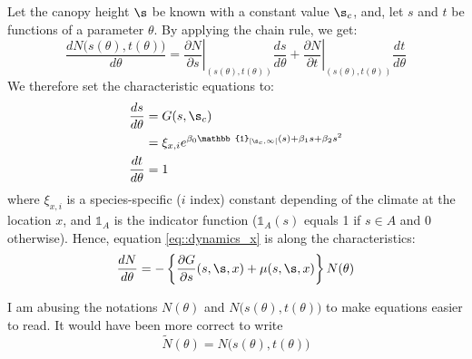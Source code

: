 \begin{refsection}
Let the canopy height $ \s $ be known with a constant value $ \s_c $, and, let $ s $ and $ t $ be functions of a parameter $ \theta $. By applying the chain rule, we get:
\[
	\frac{d N\big(s(\theta), t(\theta) \big)}{d \theta} = \left. \frac{\partial N}{\partial s} \right|_{(s(\theta), t(\theta))} \frac{ds}{d \theta} +
			\left. \frac{\partial N}{\partial t} \right|_{(s(\theta), t(\theta))} \frac{dt}{d \theta}
\]
We therefore set the characteristic equations to:
\begin{align}
	\frac{ds}{d \theta} &= G(s, \s_c) \label{eq::chara_s} \\
		&= \xi_{x, i} e^{\beta_0 \mathbb{1}_{[\s_c, \infty[}(s) + \beta_1 s + \beta_2 s^2} \nonumber \\
	\frac{dt}{d \theta} &= 1 \label{eq::chara_t}
\end{align}
where $ \xi_{x, i} $ is a species-specific ($ i $ index) constant depending of the climate at the location $ x $, and $ \mathbb{1}_A $ is the indicator function (\ie $ \mathbb{1}_A (s) $ equals 1 if $ s \in A $ and 0 otherwise). Hence, equation \eqref{eq::dynamics_x} is along the characteristics:
\begin{equation}
	\frac{dN}{d\theta} = - \left\{ \frac{\partial G}{\partial s}(s, \s, x) + \mu(s, \s, x) \right\} N(\theta) \label{eq::ODE_N}
\end{equation}
\begin{nota}
	I am abusing the notations $ N(\theta) $ and $ N\big( s(\theta), t(\theta) \big) $ to make equations easier to read. It would have been more correct to write
	\[
		\widetilde{N}(\theta) = N \big(s(\theta), t(\theta) \big)
	\]
\end{nota}


\end{refsection}
